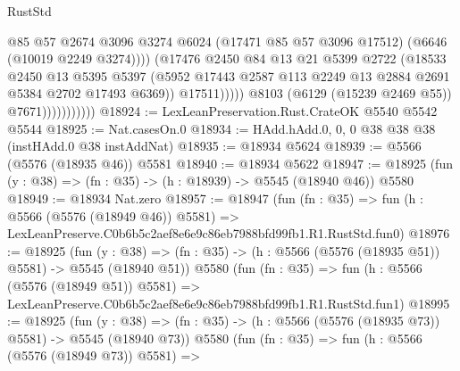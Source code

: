 \begin{lexlean}{RustStd}
\begin{coremodule}
                                      @85
                                      @57
                                      @2674
                                      @3096
                                      @3274
                                      @6024
                                      (@17471 @85 @57 @3096 @17512)
                                      (@6646 (@10019 @2249 @3274))))
                                  (@17476
                                    @2450
                                    @84
                                    @13
                                    @21
                                    @5399
                                    @2722
                                    (@18533
                                      @2450
                                      @13
                                      @5395
                                      @5397
                                      (@5952
                                        @17443
                                        @2587
                                        @113
                                        @2249
                                        @13
                                        @2884
                                        @2691
                                        @5384
                                        @2702
                                        @17493
                                        @6369))
                                    @17511)))))
                          @8103
                          (@6129 (@15239 @2469 @55))
                          @7671)))))))))))
@18924 := LexLeanPreservation.Rust.CrateOK @5540 @5542 @5544
@18925 := Nat.casesOn.{0}
@18934 := HAdd.hAdd.{0, 0, 0} @38 @38 @38 (instHAdd.{0} @38 instAddNat)
@18935 := @18934 @5624
@18939 := @5566 (@5576 (@18935 @46)) @5581
@18940 := @18934 @5622
@18947 := @18925 (fun (y : @38) => (fn : @35) -> (h : @18939) -> @5545 (@18940 @46)) @5580
@18949 := @18934 Nat.zero
@18957 := @18947
    (fun (fn : @35) =>
    fun (h : @5566 (@5576 (@18949 @46)) @5581) =>
    LexLeanPreserve.C0b6b5c2aef8e6e9c86eb7988bfd99fb1.R1.RustStd.fun0)
@18976 := @18925
    (fun (y : @38) => (fn : @35) -> (h : @5566 (@5576 (@18935 @51)) @5581) -> @5545 (@18940 @51))
    @5580
    (fun (fn : @35) =>
    fun (h : @5566 (@5576 (@18949 @51)) @5581) =>
    LexLeanPreserve.C0b6b5c2aef8e6e9c86eb7988bfd99fb1.R1.RustStd.fun1)
@18995 := @18925
    (fun (y : @38) => (fn : @35) -> (h : @5566 (@5576 (@18935 @73)) @5581) -> @5545 (@18940 @73))
    @5580
    (fun (fn : @35) =>
    fun (h : @5566 (@5576 (@18949 @73)) @5581) =>

\end{coremodule}
\end{lexlean}
